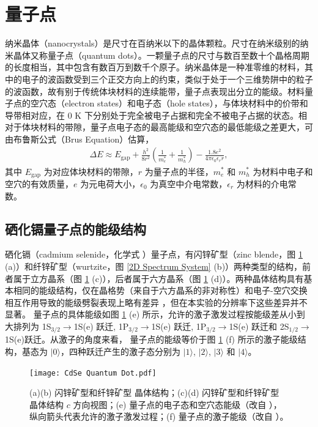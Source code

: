 \documentclass{thesis}
\begin{document}
\section{量子点}
纳米晶体（nanocrystals）是尺寸在百纳米以下的晶体颗粒。尺寸在纳米级别的纳米晶体又称量子点（quantum dots）。一颗量子点的尺寸与数百至数十个晶格周期的长度相当，其中包含有数百万到数千个原子。纳米晶体是一种准零维的材料，其中的电子的波函数受到三个正交方向上的约束，类似于处于一个三维势阱中的粒子的波函数，故有别于传统体块材料的连续能带，量子点表现出分立的能级。材料量子点的空穴态（electron states）和电子态（hole states），与体块材料中的价带和导带相对应，在 $0$ K 下分别处于完全被电子占据和完全不被电子占据的状态。相对于体块材料的带隙，量子点电子态的最高能级和空穴态的最低能级之差更大，可由布鲁斯公式（Brus Equation）\cite{brus1986electronic}\cite{kippeny2002semiconductor}估算，
\begin{align}
    \label{Brus Equ}
    \Delta E\approx E_{\text{gap}}+\frac{h^2}{8r^2}\left(\frac{1}{m_e^*}+\frac{1}{m_h^*}\right)-\frac{1.8e^2}{4\pi\epsilon_0\epsilon_rr},
\end{align}
其中 $E_{\text{gap}}$ 为对应体块材料的带隙，$r$ 为量子点的半径，$m_e^*$ 和 $m_h^*$ 为材料中电子和空穴的有效质量，$e$ 为元电荷大小，$\epsilon_0$ 为真空中介电常数，$\epsilon_r$ 为材料的介电常数。

\subsection{硒化镉量子点的能级结构}
硒化镉（cadmium selenide，化学式 ）量子点，有闪锌矿型（zinc blende，图 \ref{CdSe Quantum Dot} (a)）和纤锌矿型（wurtzite，图 \ref{2D Spectrum System} (b)）两种类型的结构，前者属于立方晶系（图 \ref{CdSe Quantum Dot} (c)），后者属于六方晶系（图 \ref{CdSe Quantum Dot} (d)）。两种晶体结构具有基本相同的能级结构，仅在晶格势（来自于六方晶系的非对称性）和电子-空穴交换相互作用导致的能级劈裂表现上略有差异 \cite{efros1996band}，但在本实验的分辨率下这些差异并不显著。 量子点的具体能级如图 \ref{CdSe Quantum Dot} (e) 所示，允许的激子激发过程按能级差从小到大排列为 1S$_{3/2}\rightarrow$1S(e) 跃迁, 1P$_{3/2}\rightarrow$1S(e) 跃迁, 1P$_{3/2}\rightarrow$1S(e) 跃迁和 2S$_{1/2}\rightarrow$1S(e)跃迁。从激子的角度来看， 量子点的能级等价于图 \ref{CdSe Quantum Dot} (f) 所示的激子能级结构，基态为 $\lvert 0\rangle$，四种跃迁产生的激子态分别为 $\lvert 1\rangle$, $\lvert 2\rangle$, $\lvert 3\rangle$ 和 $\lvert 4\rangle$。

\begin{figure}[h]
    \centering
    \texttt{[image: CdSe Quantum Dot.pdf]}
    \caption{(a)(b) 闪锌矿型和纤锌矿型  晶体结构；(c)(d) 闪锌矿型和纤锌矿型  晶体结构 $c$ 方向视图；(e)  量子点的电子态和空穴态能级（改自 \cite{caram2014persistent}），纵向箭头代表允许的激子激发过程；(f)  量子点的激子能级（改自 \cite{caram2014persistent}）。}
    \label{CdSe Quantum Dot}
\end{figure}
\end{document}

